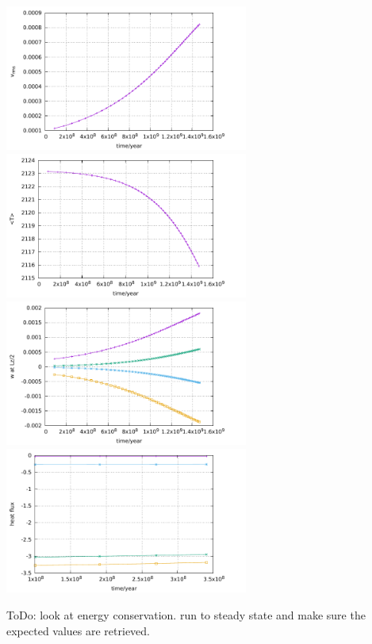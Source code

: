 \begin{center}
\includegraphics[width=8cm]{python_codes/fieldstone_20/results/vrms.pdf}
\includegraphics[width=8cm]{python_codes/fieldstone_20/results/Tavrg.pdf}\\
\includegraphics[width=8cm]{python_codes/fieldstone_20/results/wmid.pdf}
\includegraphics[width=8cm]{python_codes/fieldstone_20/results/hf.pdf}
\end{center}



{\color{red} ToDo}: look at energy conservation. run to steady state and make sure the expected values are retrieved.

